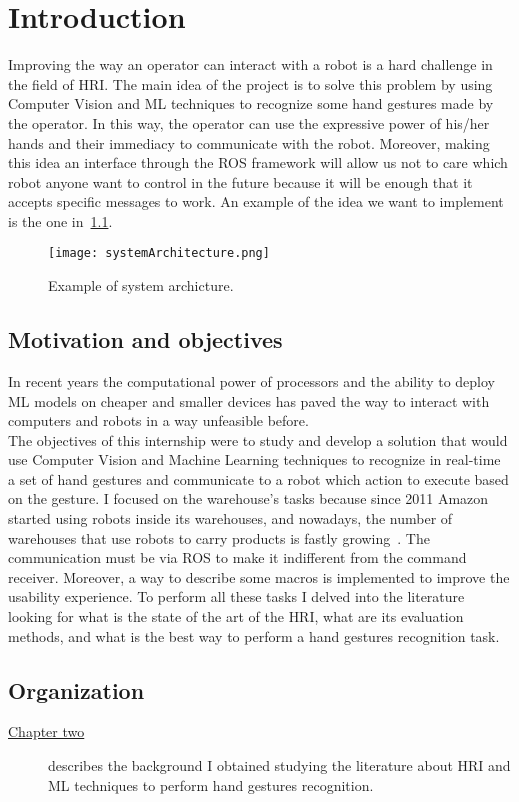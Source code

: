 \documentclass[../thesis.tex]{subfiles}
\begin{document}
\chapter{Introduction}\label{cap:introduction}
Improving the way an operator can interact with a robot is a hard challenge in the field of \acrfull{HRI}. The main idea of the project is to solve this problem by using Computer Vision and \acrfull{ML} techniques to recognize some hand gestures made by the operator. In this way, the operator can use the expressive power of his/her hands and their immediacy to communicate with the robot. Moreover, making this idea an interface through the \acrfull{ROS} framework will allow us not to care which robot anyone want to control in the future because it will be enough that it accepts specific messages to work. An example of the idea we want to implement is the one in~\ref{fig:systemArchitecture}.

\begin{figure}[H]
  \centering
  \texttt{[image: systemArchitecture.png]}
  \caption{Example of system archicture.}
  \label{fig:systemArchitecture}
\end{figure}

\section{Motivation and objectives}\label{s:motivation-and-objectives}
In recent years the computational power of processors and the ability to deploy \acrshort{ML} models on cheaper and smaller devices has paved the way to interact with computers and robots in a way unfeasible before.\\

The objectives of this internship were to study and develop a solution that would use Computer Vision and Machine Learning techniques to recognize in real-time a set of hand gestures and communicate to a robot which action to execute based on the gesture. I focused on the warehouse's tasks because since 2011 Amazon started using robots inside its warehouses, and nowadays, the number of warehouses that use robots to carry products is fastly growing~\cite{article:bogue2016}. The communication must be via \acrshort{ROS} to make it indifferent from the command receiver. Moreover, a way to describe some \glspl{macro} is implemented to improve the usability experience. To perform all these tasks I delved into the literature looking for what is the state of the art of the \acrshort{HRI}, what are its evaluation methods, and what is the best way to perform a hand gestures recognition task.

\section{Organization}\label{s:organization}
\begin{description}
    \item[{\hyperref[cap:background]{Chapter two}}] describes the background I obtained studying the literature about \acrshort{HRI} and \acrshort{ML} techniques to perform hand gestures recognition.
\end{description}
\end{document}
